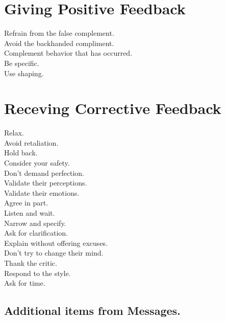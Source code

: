 \documentclass{article}
\begin{document}
\begin{multicols}{3}
	\section*{Giving Positive Feedback}

        \begin{description}
            \item[Refrain from the false complement.]
            \item[Avoid the backhanded compliment.]
            \item[Complement behavior that has occurred.]
            \item[Be specific.]
            \item[Use shaping.]
        \end{description}

	\section*{Receving Corrective Feedback}

        \begin{description}
            \item[Relax.]
            \item[Avoid retaliation.]
            \item[Hold back.]
            \item[Consider your safety.]
            \item[Don't demand perfection.]
            \item[Validate their perceptions.]
            \item[Validate their emotions.]
            \item[Agree in part.]
            \item[Listen and wait.]
            \item[Narrow and specify. ]
            \item[Ask for clarification.]
            \item[Explain without offering excuses.]
            \item[Don't try to change their mind. ]
            \item[Thank the critic.]
            \item[Respond to the style.]
            \item[Ask for time.]
        \end{description}

     \subsection*{Additional items from Messages.}
 

\end{multicols}
\end{document}
